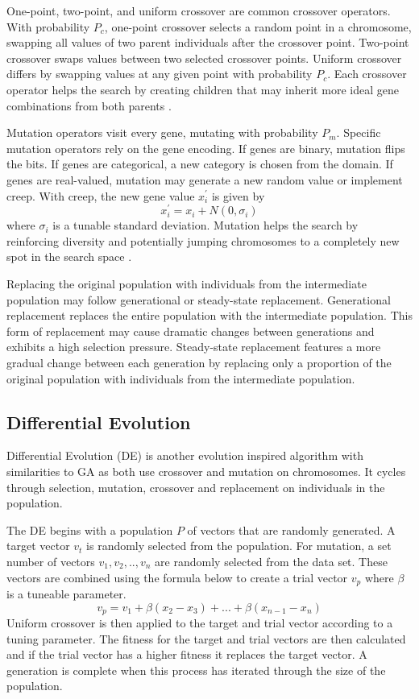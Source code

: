 \documentclass[twoside,11pt]{article}
\begin{document}
	One-point, two-point, and uniform crossover are common crossover operators. With probability $P_c$, one-point crossover selects a random point in a chromosome, swapping all values of two parent individuals after the crossover point. Two-point crossover swaps values between two selected crossover points. Uniform crossover differs by swapping values at any given point with probability $P_c$. Each crossover operator helps the search by creating children that may inherit more ideal gene combinations from both parents \citep{ga_tutorial}.
	
	
	Mutation operators visit every gene, mutating with probability $P_m$. Specific mutation operators rely on the gene encoding. If genes are binary, mutation flips the bits. If genes are categorical, a new category is chosen from the domain. If genes are real-valued, mutation may generate a new random value or implement creep. With creep, the new gene value $x_i^\prime$ is given by
	$$x_i^\prime = x_i + N(0, \sigma_i)$$
	where $\sigma_i$ is a tunable standard deviation. Mutation helps the search by reinforcing diversity and potentially jumping chromosomes to a completely new spot in the search space \citep{ga_tutorial}.
	
	Replacing the original population with individuals from the intermediate population may follow generational or steady-state replacement. Generational replacement replaces the entire population with the intermediate population. This form of replacement may cause dramatic changes between generations and exhibits a high selection pressure. Steady-state replacement features a more gradual change between each generation by replacing only a proportion of the original population with individuals from the intermediate population.

\subsection{Differential Evolution}
Differential Evolution (DE) is another evolution inspired algorithm with  similarities to GA as both use crossover and mutation on chromosomes. It cycles through selection, mutation, crossover and replacement on individuals in the population.

The DE begins with a population $P$ of vectors that are randomly generated. A target vector $v_t$ is randomly selected from the population. For mutation, a set number of vectors $v_1, v_2,.., v_n$ are randomly selected from the data set. These vectors are combined using the formula below to create a trial vector $v_p$ where $\beta$ is a tuneable parameter. $$v_p = v_1 + \beta(x_2 - x_3) + ... + \beta(x_{n-1} - x_n)$$
Uniform crossover is then applied to the target and trial vector according to a tuning parameter. The fitness for the target and trial vectors are then calculated and if the trial vector has a higher fitness it replaces the target vector. A generation is complete when this process has iterated through the size of the population. 
\end{document}
